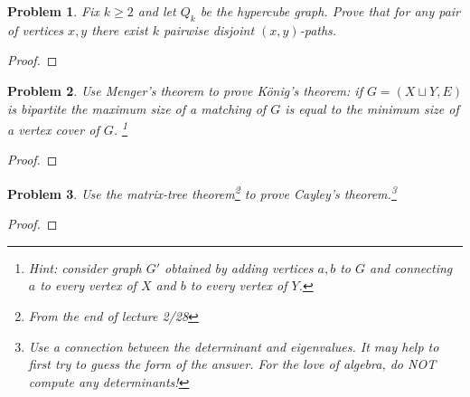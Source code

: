 \documentclass[11pt]{article}
\newtheorem{problem}{Problem}
\begin{document}
\pagebreak
\begin{problem}
Fix $k\ge2$ and let $Q_k$ be the hypercube graph. Prove that for any pair of vertices $x,y$ there exist $k$ pairwise disjoint $(x,y)$-paths. 
\end{problem}

\begin{proof}

\end{proof}

\pagebreak
\begin{problem}
Use Menger's theorem to prove K\"onig's theorem: if $G=(X\sqcup Y,E)$ is bipartite the maximum size of a matching of $G$ is equal to the minimum size of a vertex cover of $G$. \footnote{Hint: consider graph $G'$ obtained by adding vertices $a,b$ to $G$ and connecting $a$ to every vertex of $X$ and $b$ to every vertex of $Y$. } 
\end{problem}

\begin{proof}

\end{proof}


\pagebreak
\begin{problem}
Use the matrix-tree theorem\footnote{From the end of lecture 2/28} to prove Cayley's theorem.\footnote{Use a connection between the determinant and eigenvalues. It may help to first try to guess the form of the answer. For the love of algebra, do NOT compute any determinants!}
\end{problem}

\begin{proof}

\end{proof} 
\end{document}
